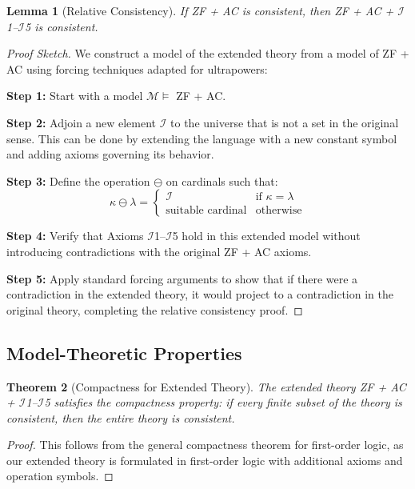 \documentclass[12pt,a4paper]{article}
\newtheorem{theorem}{Theorem}[section]
\newtheorem{lemma}[theorem]{Lemma}
\theoremstyle{definition}
\theoremstyle{remark}
\begin{document}
\begin{lemma}[Relative Consistency]
\label{lem:consistency}
If ZF + AC is consistent, then ZF + AC + $\mathcal{I}$1--$\mathcal{I}$5 is consistent.
\end{lemma}

\begin{proof}[Proof Sketch]
We construct a model of the extended theory from a model of ZF + AC using forcing techniques adapted for ultrapowers:

\textbf{Step 1:} Start with a model $\mathcal{M} \models$ ZF + AC.

\textbf{Step 2:} Adjoin a new element $\mathcal{I}$ to the universe that is not a set in the original sense. This can be done by extending the language with a new constant symbol and adding axioms governing its behavior.

\textbf{Step 3:} Define the operation $\ominus$ on cardinals such that:
\[
\kappa \ominus \lambda = \begin{cases}
\mathcal{I} & \text{if } \kappa = \lambda \\
\text{suitable cardinal} & \text{otherwise}
\end{cases}
\]

\textbf{Step 4:} Verify that Axioms $\mathcal{I}$1--$\mathcal{I}$5 hold in this extended model without introducing contradictions with the original ZF + AC axioms.

\textbf{Step 5:} Apply standard forcing arguments to show that if there were a contradiction in the extended theory, it would project to a contradiction in the original theory, completing the relative consistency proof.
\end{proof}

\subsection{Model-Theoretic Properties}

\begin{theorem}[Compactness for Extended Theory]
The extended theory ZF + AC + $\mathcal{I}$1--$\mathcal{I}$5 satisfies the compactness property: if every finite subset of the theory is consistent, then the entire theory is consistent.
\end{theorem}

\begin{proof}
This follows from the general compactness theorem for first-order logic, as our extended theory is formulated in first-order logic with additional axioms and operation symbols.
\end{proof}
\end{document}
